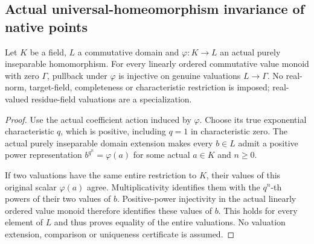 \subsection{Actual universal-homeomorphism invariance of native points}
\label{subsec:native-universal-homeomorphisms}

\begin{theorem}
\label{valuation:purely-inseparable-restriction-injective}
\leanok
Let $K$ be a field, $L$ a commutative domain and $\varphi:K\to L$ an
actual purely inseparable homomorphism. For every linearly ordered
commutative value monoid with zero $\Gamma$, pullback under $\varphi$ is
injective on genuine valuations $L\to\Gamma$.
No real-norm, target-field, completeness or characteristic restriction
is imposed; real-valued residue-field valuations are a specialization.
\end{theorem}
\begin{proof}
Use the actual coefficient action induced by $\varphi$. Choose its true
exponential characteristic $q$, which is positive, including $q=1$ in
characteristic zero. The actual purely inseparable domain extension
makes every $b\in L$ admit a positive power representation
$b^{q^n}=\varphi(a)$ for some actual $a\in K$ and $n\ge0$.

If two valuations have the same entire restriction to $K$, their
values of this original scalar $\varphi(a)$ agree. Multiplicativity
identifies them with the $q^n$-th powers of their two values of $b$.
Positive-power injectivity in the actual linearly ordered value monoid
therefore identifies these values of $b$. This holds for every element
of $L$ and thus proves equality of the entire valuations. No valuation
extension, comparison or uniqueness certificate is assumed.
\end{proof}

